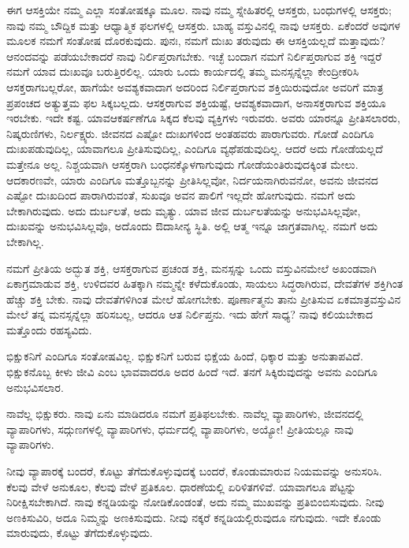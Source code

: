 ಈಗ ಆಸಕ್ತಿಯೇ ನಮ್ಮ ಎಲ್ಲಾ ಸಂತೋಷಕ್ಕೂ ಮೂಲ. ನಾವು ನಮ್ಮ ಸ್ನೇಹಿತರಲ್ಲಿ ಆಸಕ್ತರು, ಬಂಧುಗಳಲ್ಲಿ ಆಸಕ್ತರು; ನಾವು ನಮ್ಮ ಬೌದ್ದಿಕ ಮತ್ತು ಆಧ್ಯಾತ್ಮಿಕ ಫಲಗಳಲ್ಲಿ ಆಸಕ್ತರು. ಬಾಹ್ಯ ವಸ್ತುವಿನಲ್ಲಿ ನಾವು ಆಸಕ್ತರು. ಏಕೆಂದರೆ ಅವುಗಳ ಮೂಲಕ ನಮಗೆ ಸಂತೋಷ ದೊರಕುವುದು. ಪುನಃ, ನಮಗೆ ದುಃಖ ತರುವುದು ಈ ಆಸಕ್ತಿಯಲ್ಲದೆ ಮತ್ತಾವುದು? ಆನಂದವನ್ನು ಪಡೆಯಬೇಕಾದರೆ ನಾವು ನಿರ್ಲಿಪ್ತರಾಗಬೇಕು. ಇಚ್ಛೆ ಬಂದಾಗ ನಮಗೆ ನಿರ್ಲಿಪ್ತರಾಗುವ ಶಕ್ತಿ ಇದ್ದರೆ ನಮಗೆ ಯಾವ ದುಃಖವೂ ಬರುತ್ತಿರಲಿಲ್ಲ. ಯಾರು ಒಂದು ಕಾರ್ಯದಲ್ಲಿ ತಮ್ಮ ಮನಸ್ಸನ್ನೆಲ್ಲಾ ಕೇಂದ್ರೀಕರಿಸಿ ಆಸಕ್ತರಾಗಬಲ್ಲರೋ, ಹಾಗೆಯೇ ಅವಶ್ಯಕವಾದಾಗ ಅದರಿಂದ ನಿರ್ಲಿಪ್ತರಾಗುವ ಶಕ್ತಿಯಿರುವುದೋ ಅವರಿಗೆ ಮಾತ್ರ ಪ್ರಪಂಚದ ಅತ್ಯುತ್ತಮ ಫಲ ಸಿಕ್ಕಬಲ್ಲದು. ಆಸಕ್ತರಾಗುವ ಶಕ್ತಿಯಷ್ಟೆ, ಆವಶ್ಯಕವಾದಾಗ, ಅನಾಸಕ್ತರಾಗುವ ಶಕ್ತಿಯೂ ಇರಬೇಕು. ಇದೇ ಕಷ್ಟ. ಯಾವ\break ಆಕರ್ಷಣೆಗೂ ಸಿಕ್ಕದ ಕೆಲವು ವ್ಯಕ್ತಿಗಳು ಇರುವರು. ಅವರು ಯಾರನ್ನೂ ಪ್ರೀತಿಸಲಾರರು, ನಿಷ್ಕರುಣಿಗಳು, ನಿರ್ಲಕ್ಷ್ಯರು. ಜೀವನದ ಎಷ್ಟೋ ದುಃಖಗಳಿಂದ ಅಂತಹವರು ಪಾರಾಗುವರು. ಗೋಡೆ ಎಂದಿಗೂ ದುಃಖಪಡುವುದಿಲ್ಲ, ಯಾವಾಗಲೂ ಪ್ರೀತಿಸುವುದಿಲ್ಲ, ಎಂದಿಗೂ ವ್ಯಥೆಪಡುವುದಿಲ್ಲ. ಆದರೆ ಅದು ಗೋಡೆಯಲ್ಲದೆ ಮತ್ತೇನೂ ಅಲ್ಲ. ನಿಶ್ಚಯವಾಗಿ ಆಸಕ್ತರಾಗಿ ಬಂಧನಕ್ಕೊಳಗಾಗುವುದು ಗೋಡೆಯಂತಿರುವುದಕ್ಕಿಂತ ಮೇಲು. ಆದಕಾರಣವೇ, ಯಾರು ಎಂದಿಗೂ ಮತ್ತೊಬ್ಬನನ್ನು ಪ್ರೀತಿಸಿಲ್ಲವೋ, ನಿರ್ದಯನಾಗಿರುವನೋ, ಅವನು ಜೀವನದ ಎಷ್ಟೋ ದುಃಖದಿಂದ ಪಾರಾಗಿರುವಂತೆ, ಸುಖವೂ ಅವನ ಪಾಲಿಗೆ ಇಲ್ಲದೇ ಹೋಗುವುದು. ನಮಗೆ ಅದು ಬೇಕಾಗಿರುವುದು. ಅದು ದುರ್ಬಲತೆ, ಅದು ಮೃತ್ಯು. ಯಾವ ಜೀವ ದುರ್ಬಲತೆಯನ್ನು ಅನುಭವಿಸಿಲ್ಲವೋ, ದುಃಖವನ್ನು ಅನುಭವಿಸಿಲ್ಲವೊ, ಅದೊಂದು ಔದಾಸೀನ್ಯ ಸ್ಥಿತಿ. ಅಲ್ಲಿ ಆತ್ಮ ಇನ್ನೂ ಜಾಗ್ರತವಾಗಿಲ್ಲ. ನಮಗೆ ಅದು ಬೇಕಾಗಿಲ್ಲ.

\vskip 2pt

ನಮಗೆ ಪ್ರೀತಿಯ ಅದ್ಭುತ ಶಕ್ತಿ, ಆಸಕ್ತರಾಗುವ ಪ್ರಚಂಡ ಶಕ್ತಿ, ಮನಸ್ಸನ್ನು ಒಂದು ವಸ್ತುವಿನಮೇಲೆ ಅಖಂಡವಾಗಿ ಏಕಾಗ್ರಮಾಡುವ ಶಕ್ತಿ, ಉಳಿದವರ ಹಿತಕ್ಕಾಗಿ ನಮ್ಮನ್ನೇ ಕಳೆದುಕೊಂಡು, ಸಾಯಲು ಸಿದ್ಧರಾಗಿರುವ, ದೇವತೆಗಳ ಶಕ್ತಿಗಿಂತ ಹೆಚ್ಚು ಶಕ್ತಿ ಬೇಕು. ನಾವು ದೇವತೆಗಳಿಗಿಂತ ಮೇಲೆ ಹೋಗಬೇಕು. ಪೂರ್ಣಾತ್ಮನು ತಾನು ಪ್ರೀತಿಸುವ ಏಕಮಾತ್ರ\break ವಸ್ತುವಿನ ಮೇಲೆ ತನ್ನ ಮನಸ್ಸನ್ನೆಲ್ಲಾ ಹರಿಸಬಲ್ಲ, ಆದರೂ ಆತ ನಿರ್ಲಿಪ್ತನು. ಇದು ಹೇಗೆ ಸಾಧ್ಯ? ನಾವು ಕಲಿಯಬೇಕಾದ ಮತ್ತೊಂದು ರಹಸ್ಯವಿದು.

ಭಿಕ್ಷುಕನಿಗೆ ಎಂದಿಗೂ ಸಂತೋಷವಿಲ್ಲ. ಭಿಕ್ಷುಕನಿಗೆ ಬರುವ ಭಿಕ್ಷೆಯ ಹಿಂದೆ, ಧಿಕ್ಕಾರ ಮತ್ತು ಅನುತಾಪವಿದೆ. ಭಿಕ್ಷುಕನೊಬ್ಬ ಕೀಳು ಜೀವಿ ಎಂಬ ಭಾವವಾದರೂ ಅದರ ಹಿಂದೆ ಇದೆ. ತನಗೆ ಸಿಕ್ಕಿರುವುದನ್ನು ಅವನು ಎಂದಿಗೂ ಅನುಭವಿಸಲಾರ.

ನಾವೆಲ್ಲ ಭಿಕ್ಷುಕರು. ನಾವು ಏನು ಮಾಡಿದರೂ ನಮಗೆ ಪ್ರತಿಫಲಬೇಕು. ನಾವೆಲ್ಲ ವ್ಯಾಪಾರಿಗಳು, ಜೀವನದಲ್ಲಿ ವ್ಯಾಪಾರಿಗಳು, ಸದ್ಗುಣಗಳಲ್ಲಿ ವ್ಯಾಪಾರಿಗಳು, ಧರ್ಮದಲ್ಲಿ ವ್ಯಾಪಾರಿಗಳು, ಅಯ್ಯೋ! ಪ್ರೀತಿಯಲ್ಲೂ ನಾವು ವ್ಯಾಪಾರಿಗಳು.

ನೀವು ವ್ಯಾಪಾರಕ್ಕೆ ಬಂದರೆ, ಕೊಟ್ಟು ತೆಗೆದುಕೊಳ್ಳುವುದಕ್ಕೆ ಬಂದರೆ, ಕೊಂಡುಮಾರುವ ನಿಯಮವನ್ನು ಅನುಸರಿಸಿ. ಕೆಲವು ವೇಳೆ ಅನುಕೂಲ, ಕೆಲವು ವೇಳೆ ಪ್ರತಿಕೂಲ. ಧಾರಣೆಯಲ್ಲಿ ಏರಿಳಿತಗಳಿವೆ. ಯಾವಾಗಲೂ ಪೆಟ್ಟನ್ನು ನಿರೀಕ್ಷಿಸಬೇಕಾಗಿದೆ. ನಾವು ಕನ್ನಡಿಯನ್ನು ನೋಡಿಕೊಂಡಂತೆ, ಅದು ನಮ್ಮ ಮುಖವನ್ನು ಪ್ರತಿಬಿಂಬಿಸುವುದು. ನೀವು ಅಣಕಿಸುವಿರಿ, ಅದೂ ನಿಮ್ಮನ್ನು ಅಣಕಿಸುವುದು. ನೀವು ನಕ್ಕರೆ ಕನ್ನಡಿಯಲ್ಲಿರುವುದೂ ನಗುವುದು. ಇದೇ ಕೊಂಡು ಮಾರುವುದು, ಕೊಟ್ಟು ತೆಗೆದುಕೊಳ್ಳುವುದು.

